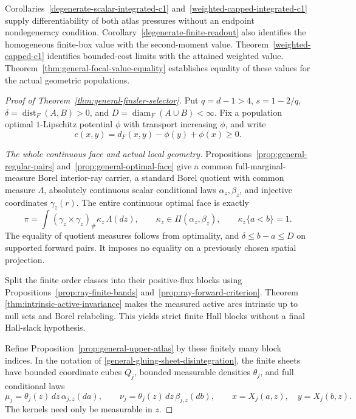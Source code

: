 \documentclass[11pt,reqno]{amsart}
\theoremstyle{definition}
\theoremstyle{remark}
\numberwithin{equation}{section}
\begin{document}
Corollaries~\ref{degenerate-scalar-integrated-c1}
and~\ref{weighted-capped-integrated-c1} supply differentiability of
both atlas pressures without an endpoint nondegeneracy condition.
Corollary~\ref{degenerate-finite-readout} also identifies the homogeneous
finite-box value with the second-moment value. Theorem~\ref{weighted-capped-c1}
identifies bounded-cost limits with the attained weighted value.
Theorem~\ref{thm:general-focal-value-equality} establishes equality of
these values for the actual geometric populations.
\begin{proof}[Proof of Theorem~\ref{thm:general-finsler-selector}]
Put \(q=d-1>4\), \(s=1-2/q\),
\(\delta=\operatorname{dist}_F(A,B)>0\), and
\(D=\operatorname{diam}_F(A\cup B)<\infty\).
Fix a population optimal \(1\)-Lipschitz potential \(\phi\) with
transport increasing \(\phi\), and write
\[
                     e(x,y)=d_F(x,y)-\phi(y)+\phi(x)\ge0.
\]

\emph{The whole continuous face and actual local geometry.}
Propositions~\ref{prop:general-regular-pairs}
and~\ref{prop:general-optimal-face} give a common full-marginal-measure
Borel interior-ray carrier, a standard Borel quotient with common
measure \(\Lambda\), absolutely continuous scalar conditional laws
\(\alpha_z,\beta_z\), and injective coordinates \(\gamma_z(r)\).
The entire continuous optimal face is exactly
\[
 \pi=\int(\gamma_z\times\gamma_z)_\#\kappa_z\,\Lambda(dz),
 \qquad
 \kappa_z\in\Pi(\alpha_z,\beta_z),\qquad
 \kappa_z\{a<b\}=1.
\]
The equality of quotient measures follows from optimality, and
\(\delta\le b-a\le D\) on supported forward pairs. It imposes no
equality on a previously chosen spatial projection.

Split the finite order classes into their positive-flux blocks using
Propositions~\ref{prop:ray-finite-bands}
and~\ref{prop:ray-forward-criterion}. Theorem~
\ref{thm:intrinsic-active-invariance} makes the measured active arcs
intrinsic up to null sets and Borel relabeling. This yields strict
finite Hall blocks without a final Hall-slack hypothesis.

Refine Proposition~\ref{prop:general-upper-atlas} by these finitely
many block indices. In the notation of
\eqref{general-gluing-sheet-disintegration}, the finite sheets have
bounded coordinate cubes \(Q_j\), bounded measurable densities
\(\theta_j\), and full conditional laws
\[
 \mu_j=\theta_j(z)\,dz\,\alpha_{j,z}(da),\qquad
 \nu_j=\theta_j(z)\,dz\,\beta_{j,z}(db),\qquad
 x=X_j(a,z),\quad y=X_j(b,z).
\]
The kernels need only be measurable in \(z\).


\end{proof}
\end{document}
